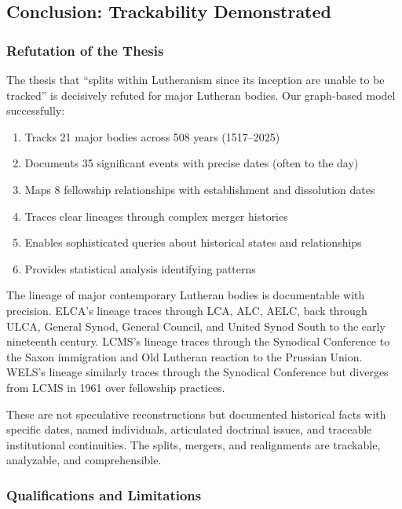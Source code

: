 \subsection{Conclusion: Trackability Demonstrated}

\subsubsection{Refutation of the Thesis}

The thesis that ``splits within Lutheranism since its inception are unable to be tracked'' is decisively refuted for major Lutheran bodies. Our graph-based model successfully:

\begin{enumerate}
\item Tracks 21 major bodies across 508 years (1517--2025)
\item Documents 35 significant events with precise dates (often to the day)
\item Maps 8 fellowship relationships with establishment and dissolution dates
\item Traces clear lineages through complex merger histories
\item Enables sophisticated queries about historical states and relationships
\item Provides statistical analysis identifying patterns
\end{enumerate}

The lineage of major contemporary Lutheran bodies is documentable with precision. ELCA's lineage traces through LCA, ALC, AELC, back through ULCA, General Synod, General Council, and United Synod South to the early nineteenth century. LCMS's lineage traces through the Synodical Conference to the Saxon immigration and Old Lutheran reaction to the Prussian Union. WELS's lineage similarly traces through the Synodical Conference but diverges from LCMS in 1961 over fellowship practices.

These are not speculative reconstructions but documented historical facts with specific dates, named individuals, articulated doctrinal issues, and traceable institutional continuities. The splits, mergers, and realignments are trackable, analyzable, and comprehensible.

\subsubsection{Qualifications and Limitations}

